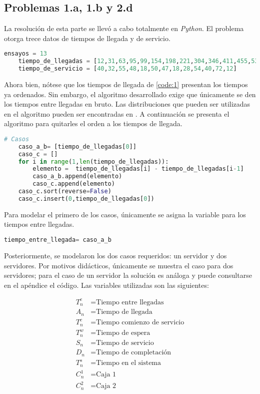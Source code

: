\documentclass[journal]{IEEEtran}
\begin{document}
\subsection{Problemas 1.a, 1.b y 2.d}
La resolución de esta parte se llevó a cabo totalmente en \textit{Python}. El problema otorga trece datos de tiempos de llegada y de servicio. 


\begin{lstlisting}[language=Python, label={code:1}, caption=Tiempos de llegada y de servicio.]
	ensayos = 13
	tiempo_de_llegadas = [12,31,63,95,99,154,198,221,304,346,411,455,537]
	tiempo_de_servicio = [40,32,55,48,18,50,47,18,28,54,40,72,12]
\end{lstlisting}

Ahora bien, nótese que los tiempos de llegada de \cref{code:1} presentan los tiempos ya ordenados. Sin embargo, el algoritmo desarrollado exige que únicamente se den los tiempos entre llegadas en bruto. Las distribuciones que pueden ser utilizadas en el algoritmo pueden ser encontradas en \cite{wackerly2014mathematical}. A continuación se presenta el algoritmo para quitarles el orden a los tiempos de llegada. 
\begin{lstlisting}[language=Python,label={code:2}, caption=Casos tiempos de llegada]
	# Casos 
	caso_a_b= [tiempo_de_llegadas[0]]
	caso_c = []
	for i in range(1,len(tiempo_de_llegadas)):
		elemento =  tiempo_de_llegadas[i] - tiempo_de_llegadas[i-1] 
		caso_a_b.append(elemento)
		caso_c.append(elemento)
	caso_c.sort(reverse=False)
	caso_c.insert(0,tiempo_de_llegadas[0])
\end{lstlisting}

Para modelar el primero de los casos, únicamente se asigna la variable para los tiempos entre llegadas. 
\begin{lstlisting}[language=Python, label={code:3}, caption=Caso a y Caso b]
	tiempo_entre_llegada= caso_a_b
\end{lstlisting}

Posteriormente, se modelaron los dos casos requeridos: un servidor y dos servidores. Por motivos didácticos, únicamente se muestra el caso para dos servidores; para el caso de un servidor la solución es análoga y puede consultarse en el apéndice el código.  Las variables utilizadas son las siguientes: 

\begin{align*}
	T^e_n &= \text{Tiempo entre llegadas}\\
	A_n &= \text{Tiempo de llegada}\\
	T^c_n &= \text{Tiempo comienzo de servicio}\\
	T^w_n &= \text{Tiempo de espera}\\
	S_n &= \text{Tiempo de servicio}\\
	D_n &= \text{Tiempo de completación}\\
	T^s_n &= \text{Tiempo en el sistema}\\
	C^1_n &= \text{Caja 1}\\
	C^2_n &= \text{Caja 2}
\end{align*}
\end{document}
